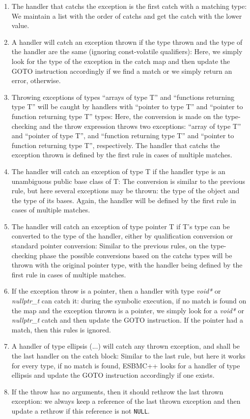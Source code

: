 \documentclass[conference]{IEEEtran}
\begin{document}
\begin{enumerate}
 \item The handler that catchs the exception is the first catch with a matching type: We maintain a list with the order of
       catchs and get the catch with the lower value.
 \item A handler will catch an exception thrown if the type thrown and the type of the handler are the same (ignoring const-volatile
       qualifiers): Here, we simply look for the type of the exception in the catch map and then update the GOTO instruction accordingly
       if we find a match or we simply return an error, otherwise.
 \item Throwing exceptions of types
  ``arrays of type T'' and ``functions returning type T'' will be caught by handlers with ``pointer to type T'' and
       ``pointer to function returning type T'' types: Here, the conversion is made on the type-checking and the throw expression
       throws two exceptions: ``array of type T'' and ``pointer of type T'', and ``function returning type T'' and ``pointer to function
       returning type T'', respectively. The handler that catchs the exception thrown is defined by the first rule in cases of
       multiple  matches.
 \item The handler will catch an exception of type T if the handler type is an unambiguous public base class of T: The conversion is
       similar to the previous rule, but here several exceptions may be thrown: the type of the object and the
       type of its bases. Again, the handler will be defined by the first rule in cases of multiple matches.
 \item The handler will catch an exception of type pointer T if T's type can be converted to the type of the handler, either by
       qualification conversion or standard pointer conversion: Similar to the previous rules, on the type-checking phase the possible
       conversions based on the catchs types will be thrown with the original pointer type, with the handler being defined by the first
       rule in cases of multiple matches.
 \item If the exception throw is a pointer, then a handler with type \textit{void*} or \textit{nullptr\_t} can catch it: during the
       symbolic execution, if no match is found on the map and the exception thrown is a pointer, we simply look for a
       \textit{void*} or \textit{nullptr\_t} catch and then update the GOTO instruction. If the pointer had a match, then this rules is
       ignored.
 \item A handler of type ellipsis (...) will catch any thrown exception, and shall be the last handler on the catch block: Similar to the
       last rule, but here it works for every type, if no match is found, ESBMC++ looks for a handler of type ellipsis and update the GOTO
       instruction accordingly if one exists.
 \item If the throw has no arguments, then it should rethrow the last thrown exception: we always keep a reference of the last
       thrown exception and then update a rethrow if this reference is not \verb|NULL|.
\end{enumerate}
\end{document}
